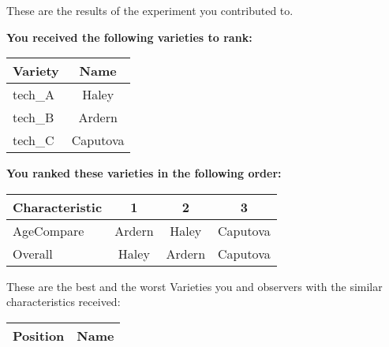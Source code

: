 \documentclass[10pt]{article}
\begin{document}
\begin{titlepage}
	These are the results of the experiment you contributed to.

	\begin{flushleft}
		\textbf{You received the following varieties to rank: }\hfill \break
		\begin{tabularx}{\textwidth}{ X | c  }
			\hline
			\textbf{Variety} & \textbf{Name} \\ \hline

			
				tech\_A & Haley \\ \hline
			
				tech\_B & Ardern \\ \hline
			
				tech\_C & Caputova \\ \hline
			


		\end{tabularx}\newline \newline

		\textbf{You ranked these varieties in the following order: }\hfill \break
		\begin{tabularx}{\textwidth}{ X | c | c | c  }
			\hline
			\textbf{Characteristic}
			
				& \textbf{ 1 }
			
				& \textbf{ 2 }
			
				& \textbf{ 3 }
			
			\\ \hline


			
				AgeCompare & Ardern  & Haley  & Caputova  \\ \hline


			
				Overall & Haley  & Ardern  & Caputova  \\ \hline


			

		\end{tabularx}

	\end{flushleft}

	\pagebreak

	\begin{flushleft}
		These are the best and the worst Varieties you and observers with the similar characteristics received:\hfill \break \newline
		\begin{tabularx}{\textwidth}{ X | X  }
			\hline
			\textbf{Position} & \textbf{Name} \\ \hline


\end{tabularx}
\end{flushleft}
\end{titlepage}
\end{document}
